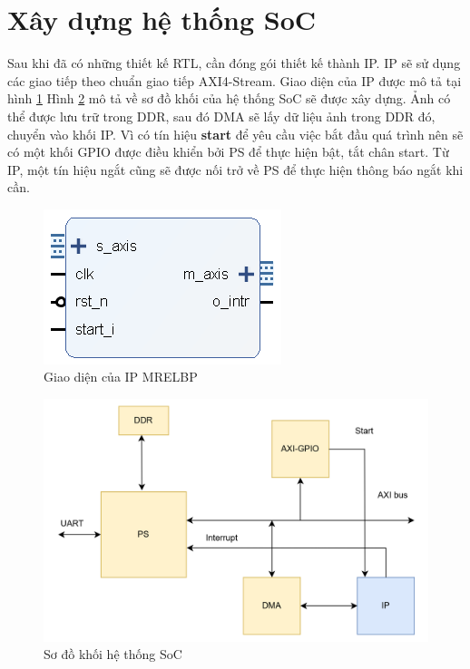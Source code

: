 \section{Xây dựng hệ thống SoC}
Sau khi đã có những thiết kế RTL, cần đóng gói thiết kế thành IP. IP sẽ sử dụng các giao tiếp theo chuẩn giao tiếp AXI4-Stream. Giao diện của IP được mô tả tại hình \ref{fig:ipInterface}
Hình \ref{fig:soc1} mô tả về sơ đồ khối của hệ thống SoC sẽ được xây dựng. Ảnh có thể được lưu trữ trong DDR, sau đó DMA sẽ lấy dữ liệu ảnh trong DDR đó, chuyển vào khối IP. Vì có tín hiệu \textbf{start} để yêu cầu việc bắt đầu quá trình nên sẽ có một khối GPIO được điều khiển bởi PS để thực hiện bật, tắt chân start. Từ IP, một tín hiệu ngắt cũng sẽ được nối trở về PS để thực hiện thông báo ngắt khi cần. 
\begin{figure}[H]
	\centering
	\includegraphics[width=0.8\linewidth]{figures/ipInterface.png}
	\caption{Giao diện của IP MRELBP}
	\label{fig:ipInterface}
\end{figure}
\begin{figure}[!ht]
	\centering
	\includegraphics[width=0.8\linewidth]{figures/soc1.png}
	\caption{Sơ đồ khối hệ thống SoC}
	\label{fig:soc1}
\end{figure}
